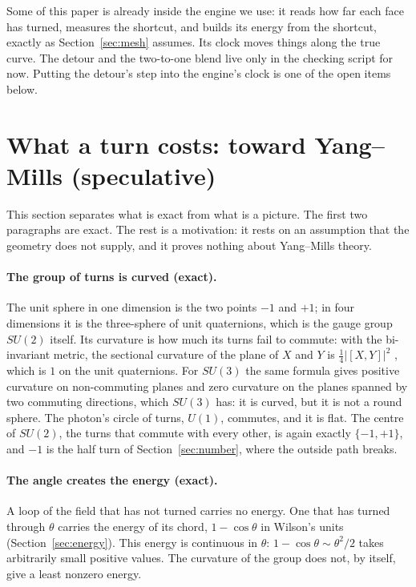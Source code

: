 \documentclass[11pt]{article}
\begin{document}
\begin{plain}
Some of this paper is already inside the engine we use: it reads how far each face has
turned, measures the shortcut, and builds its energy from the shortcut, exactly as
Section~\ref{sec:mesh} assumes. Its clock moves things along the true curve. The detour and
the two-to-one blend live only in the checking script for now. Putting the detour's step into
the engine's clock is one of the open items below.
\end{plain}

\section{What a turn costs: toward Yang--Mills (speculative)}\label{sec:ym}

This section separates what is exact from what is a picture. The first two paragraphs are exact. The rest is a
motivation: it rests on an assumption that the geometry does not supply, and it proves nothing about Yang--Mills
theory.

\paragraph{The group of turns is curved (exact).} The unit sphere in one dimension is the two points $-1$ and $+1$;
in four dimensions it is the three-sphere of unit quaternions, which is the gauge group $SU(2)$ itself. Its curvature
is how much its turns fail to commute: with the bi-invariant metric, the sectional curvature of the plane of $X$ and
$Y$ is $\tfrac14|[X,Y]|^2$ \cite{milnor}, which is $1$ on the unit quaternions. For $SU(3)$ the same formula gives
positive curvature on non-commuting planes and zero curvature on the planes spanned by two commuting directions, which
$SU(3)$ has: it is curved, but it is not a round sphere. The photon's circle of turns,
$U(1)$, commutes, and it is flat. The centre of $SU(2)$, the turns that commute with every
other, is again exactly $\{-1,+1\}$, and $-1$ is the half turn of Section~\ref{sec:number},
where the outside path breaks.

\paragraph{The angle creates the energy (exact).} A loop of the field that has not turned carries no energy. One that
has turned through $\theta$ carries the energy of its chord, $1-\cos\theta$ in Wilson's units
(Section~\ref{sec:energy}). This energy is continuous in $\theta$: $1-\cos\theta\sim\theta^2/2$ takes arbitrarily small
positive values. The curvature of the group does not, by itself, give a least nonzero energy.
\end{document}
